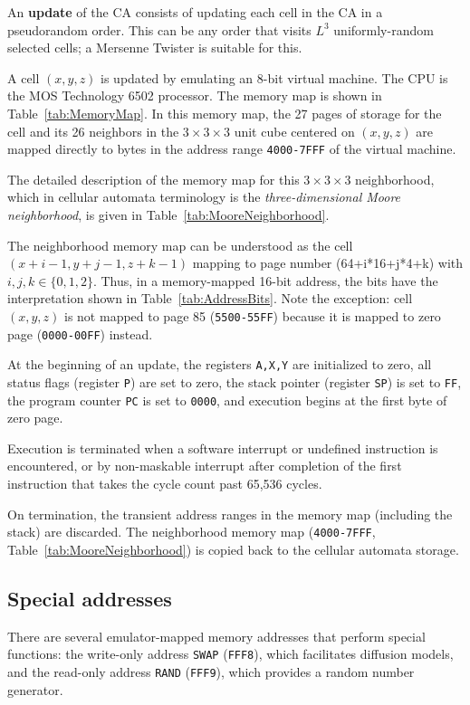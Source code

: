\documentclass{article}
\newcommand\code[1]{{\tt #1}}
\newcommand\hex[1]{{\tt #1}}
\newcommand\hexrange[2]{\hex{#1}{\tt -}\hex{#2}}
\begin{document}
An {\bf update} of the CA consists of updating each cell in the CA in a pseudorandom order.
This can be any order that visits $L^3$ uniformly-random selected cells;
a Mersenne Twister is suitable for this.

A cell $(x,y,z)$ is updated by emulating an 8-bit virtual machine.
The CPU is the MOS Technology 6502 processor.
The memory map is shown in Table~\ref{tab:MemoryMap}.
In this memory map, the 27 pages of storage
for the cell and its 26 neighbors
in the $3 \times 3 \times 3$ unit cube centered on $(x,y,z)$
are mapped directly to bytes in the address range \hexrange{4000}{7FFF} of the virtual machine.

The detailed description of the memory map for this $3 \times 3 \times 3$ neighborhood,
which in cellular automata terminology is
the {\em three-dimensional Moore neighborhood},
is given in Table~\ref{tab:MooreNeighborhood}.

The neighborhood memory map can be understood as the cell $(x+i-1,y+j-1,z+k-1)$
mapping to page number (64+i*16+j*4+k) with $i,j,k \in \{0,1,2\}$.
Thus, in a memory-mapped 16-bit address, the bits have the interpretation shown in Table~\ref{tab:AddressBits}.
Note the exception: cell $(x,y,z)$ is not mapped to page 85 (\hexrange{5500}{55FF})
because it is mapped to zero page (\hexrange{0000}{00FF}) instead.

At the beginning of an update,
the registers {\tt A,X,Y} are initialized to zero,
all status flags (register {\tt P}) are set to zero,
the stack pointer (register {\tt SP}) is set to \hex{FF},
the program counter {\tt PC} is set to \hex{0000},
and execution begins at the first byte of zero page.

Execution is terminated
when a software interrupt or undefined instruction is encountered,
or by non-maskable interrupt after
completion of the first instruction that takes the cycle count past 65,536 cycles.

On termination, the transient address ranges in the memory map
(including the stack)
are discarded.
The neighborhood memory map (\hexrange{4000}{7FFF}, Table~\ref{tab:MooreNeighborhood})
is copied back to the cellular automata storage.

\subsection{Special addresses}

There are several emulator-mapped memory addresses that perform special functions:
the write-only address \code{SWAP} (\hex{FFF8}), which facilitates diffusion models,
and the read-only address \code{RAND} (\hex{FFF9}), which provides a random number generator.
\end{document}
